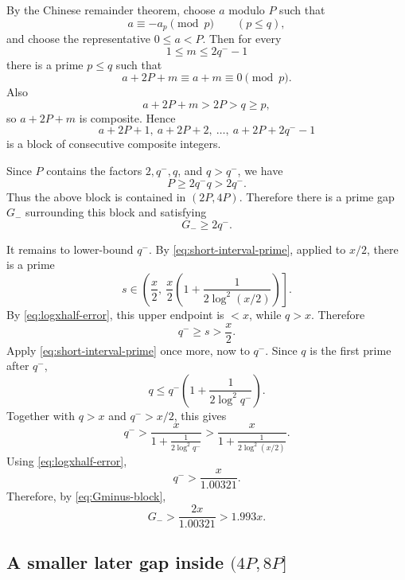 \documentclass[11pt]{article}
\numberwithin{equation}{section}
\theoremstyle{plain}
\theoremstyle{definition}
\theoremstyle{remark}
\begin{document}
By the Chinese remainder theorem, choose \(a\) modulo \(P\) such that
\[
        a\equiv -a_p\pmod p
        \qquad(p\le q),
\]
and choose the representative \(0\le a<P\).  Then for every
\[
        1\le m\le2q^- -1
\]
there is a prime \(p\le q\) such that
\[
        a+2P+m\equiv a+m\equiv0\pmod p.
\]
Also
\[
        a+2P+m>2P>q\ge p,
\]
so \(a+2P+m\) is composite.  Hence
\[
        a+2P+1,\ a+2P+2,\ \ldots,\ a+2P+2q^- -1
\]
is a block of consecutive composite integers.

Since \(P\) contains the factors \(2,q^-,q\), and \(q>q^-\), we have
\[
        P\ge2q^-q>2q^-.
\]
Thus the above block is contained in \((2P,4P)\).  Therefore there is a prime gap \(G_-\) surrounding this block and satisfying
\begin{equation}\label{eq:Gminus-block}
G_-\ge2q^-.
\end{equation}

It remains to lower-bound \(q^-\).  By \eqref{eq:short-interval-prime}, applied to \(x/2\), there is a prime
\[
        s\in
        \left(\frac x2,\ \frac x2\left(1+\frac1{2\log^2(x/2)}\right)\right].
\]
By \eqref{eq:logxhalf-error}, this upper endpoint is \(<x\), while \(q>x\).  Therefore
\begin{equation}\label{eq:qminus-half}
q^-\ge s>\frac x2.
\end{equation}
Apply \eqref{eq:short-interval-prime} once more, now to \(q^-\).  Since \(q\) is the first prime after \(q^-\),
\[
        q\le q^-\left(1+\frac1{2\log^2q^-}\right).
\]
Together with \(q>x\) and \(q^->x/2\), this gives
\[
        q^-
        >
        \frac{x}{1+\frac1{2\log^2q^-}}
        >
        \frac{x}{1+\frac1{2\log^2(x/2)}}.
\]
Using \eqref{eq:logxhalf-error},
\[
        q^->\frac{x}{1.00321}.
\]
Therefore, by \eqref{eq:Gminus-block},
\begin{equation}\label{eq:Gminus-lower}
G_->\frac{2x}{1.00321}>1.993x.
\end{equation}

\subsection{A smaller later gap inside \texorpdfstring{\((4P,8P]\)}{(4P,8P]}}
\end{document}
